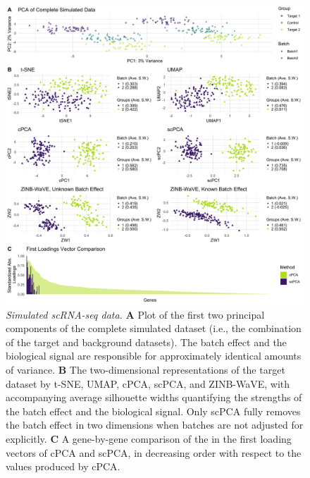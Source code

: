 \begin{figure}
  \centering
  \includegraphics[width = \textwidth]{figures/sim_results}
  \caption{
  {\em Simulated scRNA-seq data.}
  \textbf{A} Plot of the first two principal components of the complete simulated dataset (i.e., the combination of the target and background datasets). The batch effect and the biological signal are responsible for approximately identical amounts of variance. \textbf{B} The two-dimensional representations of the target dataset by t-SNE, UMAP, cPCA, scPCA, and ZINB-WaVE, with accompanying average silhouette widths quantifying the strengths of the batch effect and the biological signal. Only scPCA fully removes the batch effect in two dimensions when batches are not adjusted for explicitly. \textbf{C} A gene-by-gene comparison of the  in the first loading vectors of cPCA and scPCA, in decreasing order with respect to the values produced by cPCA.}
  \label{fig:sim}
\end{figure}

